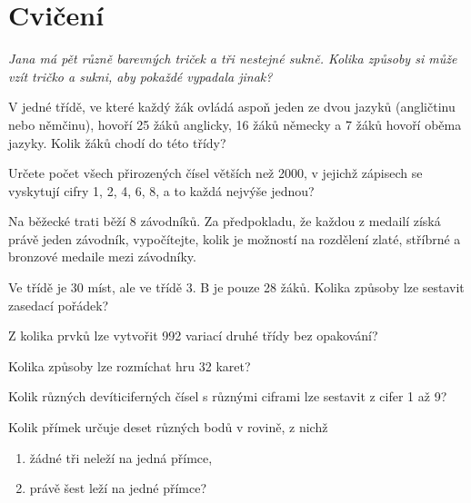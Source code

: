\section{Cvičení}

\begin{exercise}\label{exercise:ch02_1}
    \textit{Jana má pět různě barevných triček a tři nestejné sukně. Kolika způsoby si může vzít tričko a sukni, aby pokaždé vypadala jinak?} \citep[str. 145]{Petakova2020}
\end{exercise}
\begin{exercise}\label{exercise:ch02_2}
    V jedné třídě, ve které každý žák ovládá aspoň jeden ze dvou jazyků (angličtinu nebo němčinu), hovoří 25 žáků anglicky, 16 žáků německy a 7 žáků hovoří oběma jazyky. Kolik žáků chodí do této třídy? \citep[sekce Kombinatorika]{kdm2022}
\end{exercise}
\begin{exercise}\label{exercise:ch02_3}
    Určete počet všech přirozených čísel větších než 2000, v jejichž zápisech se vyskytují cifry 1, 2, 4, 6, 8, a to každá nejvýše jednou? \citep[str. 146]{Petakova2020}
\end{exercise}
\begin{exercise}\label{exercise:ch02_4}
    Na běžecké trati běží 8 závodníků. Za předpokladu, že každou z medailí získá právě jeden závodník, vypočítejte, kolik je možností na rozdělení zlaté, stříbrné a bronzové medaile mezi závodníky. \citep[str. 146]{Petakova2020}
\end{exercise}
\begin{exercise}\label{exercise:ch02_5}
    Ve třídě je 30 míst, ale ve třídě 3. B je pouze 28 žáků. Kolika způsoby lze sestavit zasedací pořádek? \citep[str. 146]{Petakova2020}
\end{exercise}
\begin{exercise}\label{exercise:ch02_6}
    Z kolika prvků lze vytvořit 992 variací druhé třídy bez opakování? \citep[str. 146]{Petakova2020}
\end{exercise}
\begin{exercise}\label{exercise:ch02_7}
    Kolika způsoby lze rozmíchat hru 32 karet? \citep[str. 146]{Petakova2020}
\end{exercise}
\begin{exercise}\label{exercise:ch02_8}
    Kolik různých devíticiferných čísel s různými ciframi lze sestavit z cifer 1 až 9? \citep[str. 146]{Petakova2020}
\end{exercise}
\begin{exercise}\label{exercise:ch02_9}
    Kolik přímek určuje deset různých bodů v rovině, z nichž
    \begin{enumerate}[label=(\alph*)]
        \item žádné tři neleží na jedná přímce,
        \item právě šest leží na jedné přímce?
    \end{enumerate}
    \citep[str. 146]{Petakova2020}
\end{exercise}
